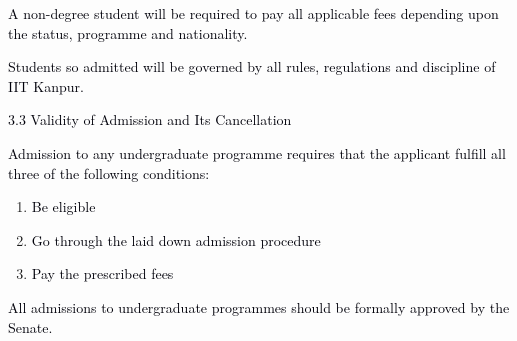 \documentclass[12pt]{article}
\begin{document}
\vspace{\baselineskip}
{\fontsize{9pt}{10.8pt}\selectfont \textcolor[HTML]{00000A}{A non-degree student will be required to pay all applicable fees depending upon the status, programme and nationality.}\par}\par


\vspace{\baselineskip}
{\fontsize{10pt}{12.0pt}\selectfont \textcolor[HTML]{00000A}{Students so admitted will be governed by all rules, regulations and discipline of IIT Kanpur.}\par}\par


\vspace{\baselineskip}
\textcolor[HTML]{00000A}{3.3 Validity of Admission and Its Cancellation}\par


\vspace{\baselineskip}
{\fontsize{10pt}{12.0pt}\selectfont \textcolor[HTML]{00000A}{Admission to any undergraduate programme requires that the applicant fulfill all three of the following conditions:}\par}\par


\vspace{\baselineskip}
\begin{enumerate}
	\item {\fontsize{10pt}{12.0pt}\selectfont \textcolor[HTML]{00000A}{Be eligible}\par}\par


\vspace{\baselineskip}
	\item {\fontsize{10pt}{12.0pt}\selectfont \textcolor[HTML]{00000A}{Go through the laid down admission procedure}\par}\par


\vspace{\baselineskip}
	\item {\fontsize{10pt}{12.0pt}\selectfont \textcolor[HTML]{00000A}{Pay the prescribed fees}\par}
\end{enumerate}\par


\vspace{\baselineskip}
{\fontsize{10pt}{12.0pt}\selectfont \textcolor[HTML]{00000A}{All admissions to undergraduate programmes should be formally approved by the Senate.}\par}\par
\end{document}
